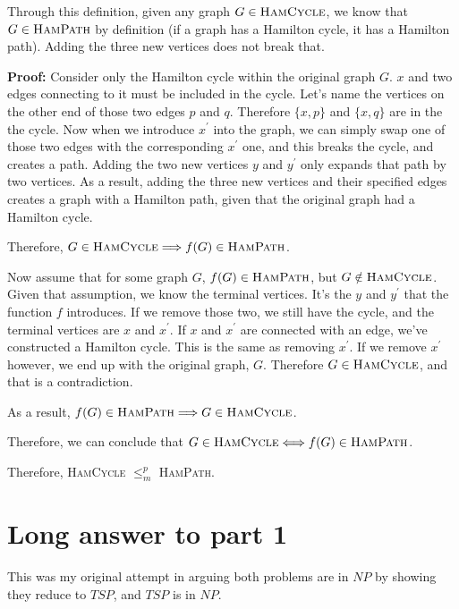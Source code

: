 \documentclass[12pt, letterpaper]{article}
\begin{document}
Through this definition, given any graph $G \in \textsc{HamCycle}$, we know that $G \in \textsc{HamPath}$ by definition (if a graph has a Hamilton cycle, it has a Hamilton path).
Adding the three new vertices does not break that.

\noindent \textbf{Proof:} Consider only the Hamilton cycle within the original graph $G$. $x$ and two edges connecting to it must be included in the cycle.
Let's name the vertices on the other end of those two edges $p$ and $q$.
Therefore $\{ x, p \}$ and $ \{ x, q \}$ are in the the cycle.
Now when we introduce $x^\prime$ into the graph, we can simply swap one of those two edges with the corresponding $x^\prime$ one, and this breaks the cycle, and creates a path.
Adding the two new vertices $y$ and $y^\prime$ only expands that path by two vertices.
As a result, adding the three new vertices and their specified edges creates a graph with a Hamilton path, given that the original graph had a Hamilton cycle.

\noindent Therefore, $G \in \textsc{HamCycle} \Longrightarrow{} f(G) \in \textsc{HamPath}$.

Now assume that for some graph $G$, $f(G) \in \textsc{HamPath}$, but $G \notin \textsc{HamCycle}$.
Given that assumption, we know the terminal vertices.
It's the $y$ and $y^\prime$ that the function $f$ introduces.
If we remove those two, we still have the cycle, and the terminal vertices are $x$ and $x^\prime$.
If $x$ and $x^\prime$ are connected with an edge, we've constructed a Hamilton cycle.
This is the same as removing $x^\prime$. If we remove $x^\prime$ however, we end up with the original graph, $G$.
Therefore $G \in \textsc{HamCycle}$, and that is a contradiction.

\noindent As a result, $f(G) \in \textsc{HamPath} \Longrightarrow{} G \in \textsc{HamCycle}$.

Therefore, we can conclude that $G \in \textsc{HamCycle} \Longleftrightarrow{} f(G) \in \textsc{HamPath}$.

\vspace{5mm}

Therefore, \textsc{HamCycle} $\leq^p_m$ \textsc{HamPath}.

\clearpage

\appendix

\section{Long answer to part 1}
This was my original attempt in arguing both problems are in $NP$ by showing they reduce to $TSP$, and $TSP$ is in $NP$.
\end{document}
